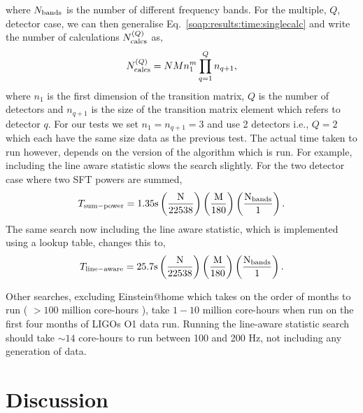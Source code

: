 where  $N_{\rm{bands}}$ is the number of different frequency
bands.
For the multiple, $Q$, detector case, we can then generalise Eq.~\ref{soap:results:time:singlecalc} and write the number of calculations $N^{(Q)}_{\rm{calcs}}$ as,
\begin{equation}
\label{soap:results:time:numbercalcs}
N^{(Q)}_{\rm{calcs}} = NMn_{1}^{m} \prod_{q=1}^{Q}n_{q+1},
\end{equation}
where $n_1$ is the first dimension of the transition matrix, $Q$ is the number of detectors and $n_{q+1}$ is the size of the transition matrix element which refers to detector $q$.
For our tests we set $n_1=n_{q+1}=3$ and use 2 detectors i.e., $Q=2$ which each have the same size data as the previous test. The actual time taken to run however, depends on the version of the algorithm which is run. For example, including the line aware statistic slows the search slightly.
For the two detector case where two \gls{SFT} powers are summed,
\begin{equation}
T_{\rm{sum-power}} = 1.35 \rm{s}\left( \frac{N}{22538}\right) \left( \frac{M}{180}\right) \left( \frac{N_{\rm{bands}}}{1}\right).
\end{equation}
The same search now including the line aware statistic, which is implemented using a lookup table, changes this to,
\begin{equation}
T_{\rm{line-aware}} = 25.7 \rm{s}\left( \frac{N}{22538}\right) \left( \frac{M}{180}\right) \left( \frac{N_{\rm{bands}}}{1}\right).
\end{equation}

Other searches, excluding Einstein@home which takes on the order of months to
run ( $>100$ million core-hours \citep{walsh2016ComparisonMethods}), take
$1-10$ million core-hours \citep{walsh2016ComparisonMethods} when run on the first four months of \glspl{LIGO} O1 data run.
Running the line-aware statistic search should take $\sim 14$ core-hours to run between 100 and 200 Hz, not including any generation of data.
 
\section{\label{soap:dicussion}Discussion}

